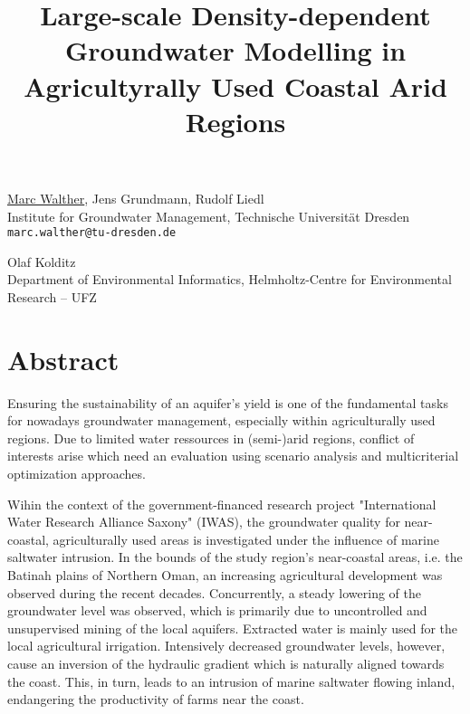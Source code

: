 \title{Large-scale Density-dependent Groundwater Modelling in Agricultyrally Used Coastal Arid Regions}
\author{} \institute{}
\maketitle

\begin{center}
{\large \underline{Marc Walther}, Jens Grundmann, Rudolf Liedl}\\
Institute for Groundwater Management, Technische Universit\"at Dresden\\
{\tt marc.walther@tu-dresden.de}\\
\vspace{4mm}

{\large Olaf Kolditz}\\
Department of Environmental Informatics, Helmholtz-Centre for Environmental Research -- UFZ
\end{center}

\section*{Abstract}
Ensuring the sustainability of an aquifer's yield is one of the fundamental tasks for nowadays groundwater management, especially within agriculturally used regions. Due to limited water ressources in (semi-)arid regions, conflict of interests arise which need an evaluation using scenario analysis and multicriterial optimization approaches. 

Wihin the context of the government-financed research project "International Water Research Alliance Saxony" (IWAS), the groundwater quality for near-coastal, agriculturally used areas is investigated under the influence of marine saltwater intrusion. In the bounds of the study region's near-coastal areas, i.e. the Batinah plains of Northern Oman, an increasing agricultural development was observed during the recent decades. Concurrently, a steady lowering of the groundwater level was observed, which is primarily due to uncontrolled and unsupervised mining of the local aquifers. Extracted water is mainly used for the local agricultural irrigation. Intensively decreased groundwater levels, however, cause an inversion of the hydraulic gradient which is naturally aligned towards the coast. This, in turn, leads to an intrusion of marine saltwater flowing inland, endangering the productivity of farms near the coast.

